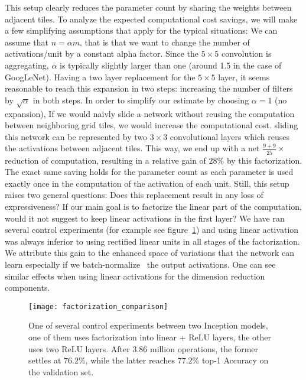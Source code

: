 \documentclass[10pt,twocolumn,letterpaper]{article}
\begin{document}
This setup clearly reduces the parameter count
by sharing the weights between adjacent tiles.
To analyze the expected computational cost savings,
we will make a few simplifying assumptions that apply for the typical
situations: We can assume that $n=\alpha m$, that is that we want to change the
number of activations/unit by a constant alpha factor. Since the $5\times 5$
convolution is aggregating, $\alpha$ is typically slightly larger
than one (around 1.5 in the case of GoogLeNet). Having a two layer replacement
for the $5\times 5$ layer, it seems reasonable to reach this expansion in two
steps: increasing the number of filters by $\sqrt{\alpha}$ in both steps.
In order to simplify our estimate by choosing $\alpha=1$ (no expansion),
If we would naivly slide a network without reusing the computation between
neighboring grid tiles, we would increase the computational cost.
sliding this network can be represented by two $3\times 3$ convolutional layers
which reuses the activations between adjacent tiles.
This way, we end up with a net $\frac{9+9}{25}\times$ reduction
of computation, resulting in a relative gain of $28\%$ by this factorization.
The exact same saving holds for the parameter count as each parameter
is used exactly once in the computation of the activation of each unit.
Still, this setup raises two general questions: Does this replacement result in
any loss of expressiveness? If our main goal is to factorize the linear part of
the computation, would it not suggest to keep linear activations in
the first layer? We have ran several control experiments
(for example see figure~\ref{fig:factorization_comparison}) and using
linear activation was always inferior to using rectified linear units in
all stages of the factorization.
We attribute this gain to the enhanced space of variations that the network
can learn especially if we batch-normalize~\cite{ioffe2015batch} the
output activations. One can see similar effects when using linear activations
for the dimension reduction components.
\begin{figure}
\centering
\texttt{[image: factorization\_comparison]}
\caption{One of several control experiments between two Inception models,
  one of them uses factorization into linear + ReLU layers, the other uses
  two ReLU layers. After $3.86$ million operations, the former settles at
  $76.2\%$, while the latter reaches $77.2\%$ top-1 Accuracy on the
  validation set.}
\label{fig:factorization_comparison}
\end{figure}
\end{document}
